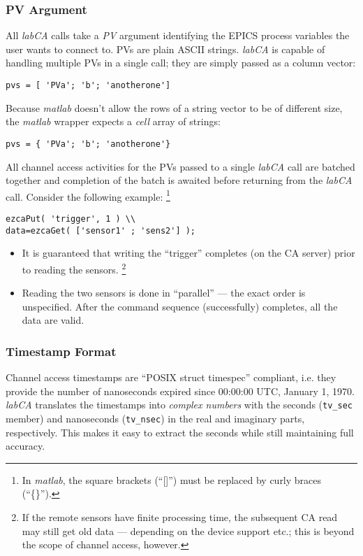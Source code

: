 \documentclass{article}
\newcommand{\sca}{{\em labCA}}
\newcommand{\matlab}{{\em matlab}}
\begin{document}
\subsubsection{PV Argument}
All \sca{} calls take a {\em PV} argument identifying
the EPICS process variables the user wants to connect to.
PVs are plain ASCII strings. \sca{} is capable of handling
multiple PVs in a single call; they are simply passed as a
column vector:
\begin{verbatim}
pvs = [ 'PVa'; 'b'; 'anotherone']
\end{verbatim}
Because \matlab{} doesn't allow the rows of
a string vector to be of different size, the \matlab{}
wrapper expects a {\em cell} array of strings:
\begin{verbatim}
pvs = { 'PVa'; 'b'; 'anotherone'}
\end{verbatim}

All channel access activities for the PVs
passed to a single \sca{} call are batched together and
completion of the batch is awaited before returning from
the \sca{} call. Consider the following example:%
\footnote{
In \matlab{}, the square brackets (``[]'') must be replaced
by curly braces (``\{\}'').}
\begin{verbatim}
ezcaPut( 'trigger', 1 ) \\
data=ezcaGet( ['sensor1' ; 'sens2'] );
\end{verbatim}
\begin{itemize}
%
\item It is guaranteed that writing the ``trigger''
completes (on the CA server) prior to reading the
sensors.%
\footnote{If the remote sensors have finite
processing time, the subsequent CA read may still
get old data --- depending on the device support
etc.; this is beyond the scope of channel access, however.}
%
\item Reading the two sensors is done in ``parallel'' ---
the exact order is unspecified. After the command sequence
(successfully) completes, all the data are valid.
\end{itemize}

\subsubsection{Timestamp Format}
\label{tsformat}
Channel access timestamps are ``POSIX struct timespec''
compliant, i.e. they provide the number of nanoseconds
expired since 00:00:00 UTC, January 1, 1970. \sca{} 
translates the timestamps into {\em complex numbers}
with the seconds ({\tt tv\_sec} member) and nanoseconds
({\tt tv\_nsec}) in the real and imaginary parts, respectively.
This makes it easy to extract the seconds while still maintaining
full accuracy.
\end{document}
